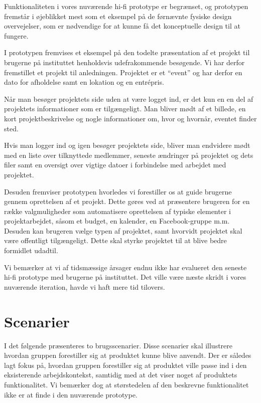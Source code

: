 Funktionaliteten i vores nuværende hi-fi prototype er begrænset, og prototypen fremstår i øjeblikket mest som et eksempel på de førnævnte fysiske design overvejelser, som er nødvendige for at kunne få det konceptuelle design til at fungere.

I prototypen fremvises et eksempel på den todelte præsentation af et projekt til brugerne på instituttet henholdsvis udefrakommende besøgende. Vi har derfor fremstillet et projekt til anledningen. Projektet er et “event” og har derfor en dato for afholdelse samt en lokation og en entrépris.

Når man besøger projektets side uden at være logget ind, er det kun en en del af projektets informationer som er tilgængeligt. Man bliver mødt af et billede, en kort projektbeskrivelse og nogle informationer om, hvor og hvornår, eventet finder sted. 

Hvis man logger ind og igen besøger projektets side, bliver man endvidere mødt med en liste over tilknyttede medlemmer, seneste ændringer på projektet og dets filer samt en oversigt over vigtige datoer i forbindelse med arbejdet med projektet.

Desuden fremviser prototypen hvorledes vi forestiller os at guide brugerne gennem oprettelsen af et projekt. Dette gøres ved at præsentere brugeren for en række valgmuligheder som automatisere oprettelsen af typiske elementer i projektarbejdet, såsom et budget, en kalender, en Facebook-gruppe m.m. Desuden kan brugeren vælge typen af projektet, samt hvorvidt projektet skal være offentligt tilgængeligt. Dette skal styrke projektet til at blive bedre formidlet udadtil.

Vi bemærker at vi af tidsmæssige årsager endnu ikke har evalueret den seneste hi-fi prototype med brugerne på instituttet. Det ville være næste skridt i vores nuværende iteration, havde vi haft mere tid tilovers.

\section{Scenarier}
I det følgende præsenteres to brugsscenarier. Disse scenarier skal illustrere hvordan gruppen forestiller sig at produktet kunne blive anvendt. Der er således lagt fokus på, hvordan gruppen forestiller sig at produktet ville passe ind i den eksisterende arbejdskontekst, samtidig med at det viser noget af produktets funktionalitet. Vi bemærker dog at størstedelen af den beskrevne funktionalitet ikke er at finde i den nuværende prototype.

